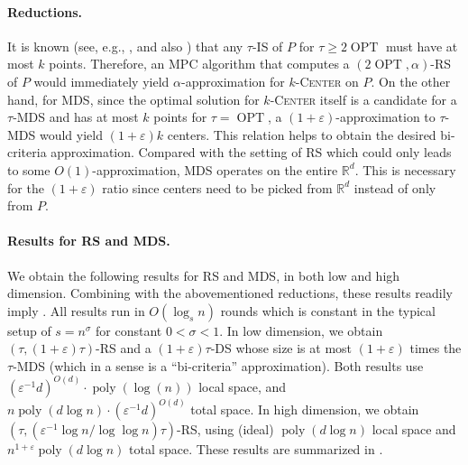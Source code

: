 \documentclass[11pt,letterpaper]{article}
\theoremstyle{plain}
\theoremstyle{definition}
\theoremstyle{remark}
\newcommand{\ProblemName}[1]{\textsc{#1}}
\newcommand{\kCenter}{$k$-\ProblemName{Center}\xspace}
\DeclareMathOperator{\poly}{poly}
\DeclareMathOperator{\OPT}{OPT}
\renewcommand{\epsilon}{\ensuremath{\varepsilon}}
\let\epsilon\varepsilon
\begin{document}
\paragraph{Reductions.}
It is known (see, e.g., \cite{DBLP:journals/jacm/HochbaumS86}, and also ) that any $\tau$-IS  of $P$ for $\tau \geq 2\OPT$ must have at most $k$ points.
Therefore, an MPC algorithm that computes a $(2\OPT, \alpha)$-RS of $P$ would immediately yield $\alpha$-approximation for \kCenter on $P$.
On the other hand, for MDS,
since the optimal solution for \kCenter itself is a candidate for a $\tau$-MDS
and has at most $k$ points for $\tau = \OPT$,
a $(1 + \epsilon)$-approximation to $\tau$-MDS would yield $(1 + \epsilon)k$ centers.
This relation helps to obtain the desired bi-criteria approximation.
Compared with the setting of RS which could only leads to some $O(1)$-approximation,
MDS operates on the entire $\mathbb{R}^d$.
This is necessary for the $(1 + \epsilon)$ ratio since centers need to be picked from $\mathbb{R}^d$ instead of only from $P$.


\paragraph{Results for RS and MDS.}
We obtain the following results for RS and MDS, in both low and high dimension.
Combining with the abovementioned reductions, these results readily imply .
All results run in $O(\log_s n)$ rounds which is constant in the typical setup of $s = n^{\sigma}$ for constant $0 < \sigma < 1$.
In low dimension, we obtain $(\tau, (1 + \epsilon)\tau)$-RS and a $(1 + \epsilon)\tau$-DS whose size is at most $(1 + \epsilon)$ times the $\tau$-MDS (which in a sense is a ``bi-criteria'' approximation).
Both results use $(\epsilon^{-1}d)^{O(d)} \cdot \poly(\log(n))$ local space,
and $n \poly(d\log n) \cdot (\epsilon^{-1}d)^{O(d)}$ total space.
In high dimension, we obtain $(\tau, (\epsilon^{-1} \log n / \log\log n)\tau)$-RS,
using (ideal) $\poly(d\log n)$ local space and $n^{1 + \epsilon} \poly(d \log n)$ total space.
These results are summarized in .
\end{document}
